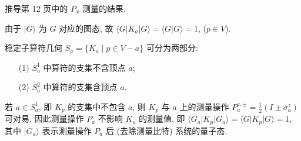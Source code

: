 \documentclass{assignment}
\begin{document}
\begin{prob}
    推导第 12 页中的 $P_x$ 测量的结果.
\end{prob}
\begin{pf}
    由于 $\lvert G\rangle$ 为 $G$ 对应的图态, 故 $\langle G\rvert K_a\lvert G\rangle=\langle G\vert G\rangle=1$, ($p\in V$).

    稳定子算符几何 $S_a=\{K_a\mid p\in V-a\}$ 可分为两部分:
    \begin{itemize}
        \item[(1)] $S_a^1$ 中算符的支集不含顶点 $a$;
        \item[(2)] $S_a^2$ 中算符的支集含顶点 $a$.
    \end{itemize}
    若 $a\in S_a^1$, 即 $K_p$ 的支集中不包含 $a$, 则 $K_p$ 与 $a$ 上的测量操作 $P_a^{z,\pm}=\frac{1}{2}(I\pm\sigma_a^z)$ 可对易, 因此测量操作 $P_a$ 不影响 $K_a$ 的测量值, 即 $\langle G_a\rvert K_p\lvert G_a\rangle=\langle G\rvert K_p\lvert G\rangle=1$, 其中 $\lvert G_a\rangle$ 表示测量操作 $P_a$ 后 (去除测量比特) 系统的量子态.


\end{pf}
\end{document}
